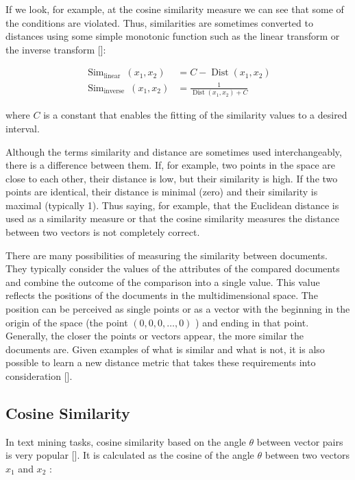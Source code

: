 If we look, for example, at the cosine similarity measure we can see that some of the conditions are violated. Thus, similarities are sometimes converted to distances using some simple monotonic function such as the linear transform or the inverse transform [\cite{ref130}]:


\begin{align*}
\operatorname{Sim}_{\text {linear }}\left(x_{1}, x_{2}\right) & =C-\operatorname{Dist}\left(x_{1}, x_{2}\right)  \tag{12.2}\\
\operatorname{Sim}_{\text {inverse }}\left(x_{1}, x_{2}\right) & =\frac{1}{\operatorname{Dist}\left(x_{1}, x_{2}\right)+C} \tag{12.3}
\end{align*}


where $C$ is a constant that enables the fitting of the similarity values to a desired interval.

Although the terms similarity and distance are sometimes used interchangeably, there is a difference between them. If, for example, two points in the space are close to each other, their distance is low, but their similarity is high. If the two points are identical, their distance is minimal (zero) and their similarity is maximal (typically 1). Thus saying, for example, that the Euclidean distance is used as a similarity measure or that the cosine similarity measures the distance between two vectors is not completely correct.

There are many possibilities of measuring the similarity between documents. They typically consider the values of the attributes of the compared documents and combine the outcome of the comparison into a single value. This value reflects the positions of the documents in the multidimensional space. The position can be perceived as single points or as a vector with the beginning in the origin of the space (the point $(0,0,0, \ldots, 0)$ ) and ending in that point. Generally, the closer the points or vectors appear, the more similar the documents are. Given examples of what is similar and what is not, it is also possible to learn a new distance metric that takes these requirements into consideration [\cite{ref283}].

\subsection{Cosine Similarity}
In text mining tasks, cosine similarity based on the angle $\theta$ between vector pairs is very popular [\cite{ref138}]. It is calculated as the cosine of the angle $\theta$ between two vectors $x_{1}$ and $x_{2}$ :


